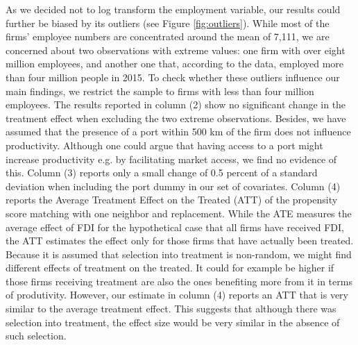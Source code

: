 \documentclass[a4paper,11pt]{scrartcl}
\begin{document}
As we decided not to log transform the employment variable, our results could further be biased by its outliers (see Figure \ref{fig:outliers}). While most of the firms' employee numbers are concentrated around the mean of 7,111, we are concerned about two observations with extreme values: one firm with over eight million employees, and another one that, according to the data, employed more than four million people in 2015. To check whether these outliers influence our main findings, we restrict the sample to firms with less than four million employees. The results reported in column (2) show no significant change in the treatment effect when excluding the two extreme observations. %
Besides, we have assumed that the presence of a port within 500 km of the firm does not influence productivity. Although one could argue that having access to a port might increase productivity e.g. by facilitating market access, we find no evidence of this.  Column (3) reports only a small change of 0.5 percent of a standard deviation when including the port dummy in our set of covariates. 
Column (4) reports the Average Treatment Effect on the Treated (ATT) of the propensity score matching with one neighbor and replacement. While the ATE measures the average effect of FDI for the hypothetical case that all firms have received FDI, the ATT estimates the effect only for those firms that have actually been treated. Because it is assumed that selection into treatment is non-random, we might find different effects of treatment on the treated. It could for example be higher if those firms receiving treatment are also the ones benefiting more from it in terms of produtivity.
 However, our estimate in column (4) reports an ATT that is very similar to the average treatment effect. This suggests that although there was selection into treatment, the effect size would be very similar in the absence of such selection. 
\end{document}
